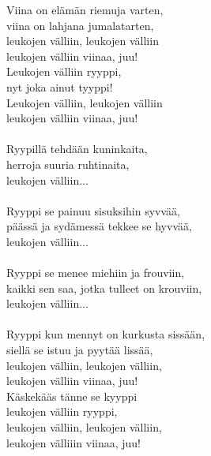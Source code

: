 
Viina on elämän riemuja varten, \\ viina on lahjana jumalatarten, \\ leukojen välliin, leukojen välliin \\ leukojen välliin viinaa, juu! \\ Leukojen välliin ryyppi, \\ nyt joka ainut tyyppi! \\ Leukojen välliin, leukojen välliin \\ leukojen välliin viinaa, juu! \\ \hspace{10mm} \\ Ryypillä tehdään kuninkaita, \\ herroja suuria ruhtinaita, \\ leukojen välliin... \\ \hspace{10mm} \\ Ryyppi se painuu sisuksihin syvvää, \\ päässä ja sydämessä tekkee se hyvvää, \\ leukojen välliin... \\ \hspace{10mm} \\ Ryyppi se menee miehiin ja frouviin, \\ kaikki sen saa, jotka tulleet on krouviin, \\ leukojen välliin... \\ \hspace{10mm} \\ Ryyppi kun mennyt on kurkusta sissään, \\ siellä se istuu ja pyytää lissää, \\ leukojen välliin, leukojen välliin, \\ leukojen välliin viinaa, juu! \\ Käskekääs tänne se kyyppi \\ leukojen välliin ryyppi, \\ leukojen välliin, leukojen välliin, \\ leukojen välliiin viinaa, juu!